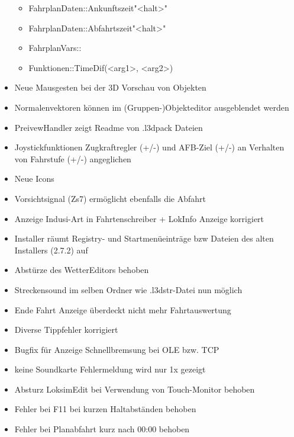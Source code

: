 \begin{itemize}
  \begin{itemize}
  \itemsep1pt\parskip0pt
  \item
    FahrplanDaten::Ankunftszeit"\textless{}halt\textgreater{}"
  \item
    FahrplanDaten::Abfahrtszeit"\textless{}halt\textgreater{}"
  \item
    FahrplanVars::
  \item
    Funktionen::TimeDif(\textless{}arg1\textgreater{},
    \textless{}arg2\textgreater{})
  \end{itemize}
\item
  Neue Mausgesten bei der 3D Vorschau von Objekten
\item
  Normalenvektoren können im (Gruppen-)Objekteditor ausgeblendet werden
\item
  PreivewHandler zeigt Readme von .l3dpack Dateien
\item
  Joystickfunktionen Zugkraftregler (+/-) und AFB-Ziel (+/-) an
  Verhalten von Fahrstufe (+/-) angeglichen
\item
  Neue Icons
\end{itemize}

\begin{itemize}
\itemsep1pt\parskip0pt
\item
  Vorsichtsignal (Zs7) ermöglicht ebenfalls die Abfahrt
\item
  Anzeige Indusi-Art in Fahrtenschreiber + LokInfo Anzeige korrigiert
\item
  Installer räumt Registry- und Startmenüeinträge bzw Dateien des alten
  Installers (2.7.2) auf
\item
  Abstürze des WetterEditors behoben
\item
  Streckensound im selben Ordner wie .l3dstr-Datei nun möglich
\item
  Ende Fahrt Anzeige überdeckt nicht mehr Fahrtauswertung
\item
  Diverse Tippfehler korrigiert
\item
  Bugfix für Anzeige Schnellbremsung bei OLE bzw. TCP
\item
  keine Soundkarte Fehlermeldung wird nur 1x gezeigt
\item
  Absturz LoksimEdit bei Verwendung von Touch-Monitor behoben
\item
  Fehler bei F11 bei kurzen Haltabständen behoben
\item
  Fehler bei Planabfahrt kurz nach 00:00 behoben
\end{itemize}

